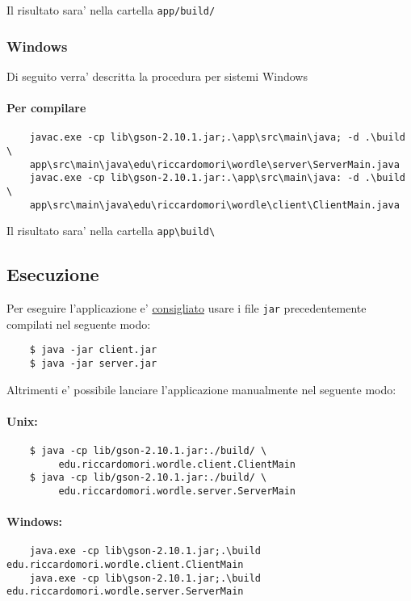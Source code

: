 Il risultato sara' nella cartella \texttt{app/build/}

\medskip
\subsubsection{Windows}
Di seguito verra' descritta la procedura per sistemi Windows

\paragraph{Per compilare}
\begin{verbatim}
	javac.exe -cp lib\gson-2.10.1.jar;.\app\src\main\java; -d .\build \ 
	app\src\main\java\edu\riccardomori\wordle\server\ServerMain.java
	javac.exe -cp lib\gson-2.10.1.jar:.\app\src\main\java: -d .\build \
	app\src\main\java\edu\riccardomori\wordle\client\ClientMain.java
\end{verbatim}

Il risultato sara' nella cartella \texttt{app\textbackslash build\textbackslash}

\bigskip
\subsection{Esecuzione}

Per eseguire l'applicazione e' \underline{consigliato} usare i file \texttt{jar} precedentemente compilati nel seguente modo:
\begin{verbatim}
	$ java -jar client.jar
	$ java -jar server.jar
\end{verbatim}

Altrimenti e' possibile lanciare l'applicazione manualmente nel seguente modo:

\paragraph{Unix:}
\begin{verbatim}
	$ java -cp lib/gson-2.10.1.jar:./build/ \
	     edu.riccardomori.wordle.client.ClientMain
	$ java -cp lib/gson-2.10.1.jar:./build/ \
	     edu.riccardomori.wordle.server.ServerMain
\end{verbatim}


\paragraph{Windows:}
\begin{verbatim}
	java.exe -cp lib\gson-2.10.1.jar;.\build edu.riccardomori.wordle.client.ClientMain
	java.exe -cp lib\gson-2.10.1.jar;.\build edu.riccardomori.wordle.server.ServerMain
\end{verbatim}
